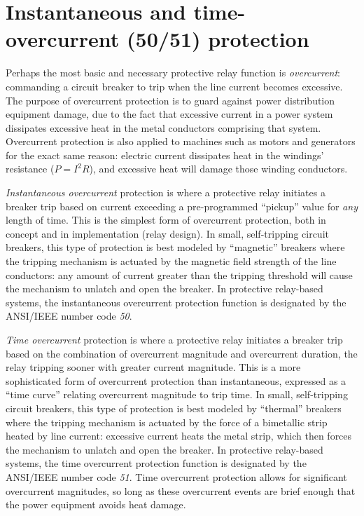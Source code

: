 \filbreak
\section{Instantaneous and time-overcurrent (50/51) protection}

Perhaps the most basic and necessary protective relay function is \textit{overcurrent}: commanding a circuit breaker to trip when the line current becomes excessive.  The purpose of overcurrent protection is to guard against power distribution equipment damage, due to the fact that excessive current in a power system dissipates excessive heat in the metal conductors comprising that system.  Overcurrent protection is also applied to machines such as motors and generators for the exact same reason: electric current dissipates heat in the windings' resistance ($P = I^2 R$), and excessive heat will damage those winding conductors.

\textit{Instantaneous overcurrent} protection is where a protective relay initiates a breaker trip based on current exceeding a pre-programmed ``pickup'' value for \textit{any} length of time.  This is the simplest form of overcurrent protection, both in concept and in implementation (relay design).  In small, self-tripping circuit breakers, this type of protection is best modeled by ``magnetic'' breakers where the tripping mechanism is actuated by the magnetic field strength of the line conductors: any amount of current greater than the tripping threshold will cause the mechanism to unlatch and open the breaker.  In protective relay-based systems, the instantaneous overcurrent protection function is designated by the ANSI/IEEE number code \textit{50}.       

\textit{Time overcurrent} protection is where a protective relay initiates a breaker trip based on the combination of overcurrent magnitude and overcurrent duration, the relay tripping sooner with greater current magnitude.  This is a more sophisticated form of overcurrent protection than instantaneous, expressed as a ``time curve'' relating overcurrent magnitude to trip time.  In small, self-tripping circuit breakers, this type of protection is best modeled by ``thermal'' breakers where the tripping mechanism is actuated by the force of a bimetallic strip heated by line current: excessive current heats the metal strip, which then forces the mechanism to unlatch and open the breaker.  In protective relay-based systems, the time overcurrent protection function is designated by the ANSI/IEEE number code \textit{51}.  Time overcurrent protection allows for significant overcurrent magnitudes, so long as these overcurrent events are brief enough that the power equipment avoids heat damage.    

